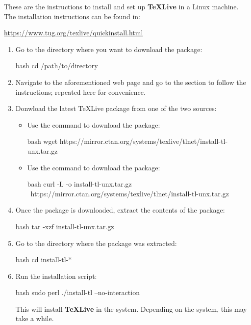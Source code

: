 These are the instructions to install and set up \textbf{TeXLive} in a Linux machine. The
installation instructions can be found in:
\begin{center}
    \url{https://www.tug.org/texlive/quickinstall.html}
\end{center}
\begin{enumerate}
    \item Go to the directory where you want to download the package:
    \begin{mintedbox}{bash}
cd /path/to/directory
    \end{mintedbox}
    \item Navigate to the aforementioned web page and go to the 
    section to follow the instructions; repeated here for convenience.
    \item Donwload the latest TeXLive package from one of the two sources:
    \begin{itemize}
        \item Use the  command to download the package:
        \begin{mintedbox}{bash}
wget https://mirror.ctan.org/systems/texlive/tlnet/install-tl-unx.tar.gz
        \end{mintedbox}
        \item Use the  command to download the package:
        \begin{mintedbox}{bash}
curl -L -o install-tl-unx.tar.gz \
https://mirror.ctan.org/systems/texlive/tlnet/install-tl-unx.tar.gz
        \end{mintedbox}
    \end{itemize}
    \item Once the package is downloaded, extract the contents of the package:
    \begin{mintedbox}{bash}
tar -xzf install-tl-unx.tar.gz
    \end{mintedbox}
    \item Go to the directory where the package was extracted:
    \begin{mintedbox}{bash}
cd install-tl-*
    \end{mintedbox}
    \item Run the installation script:
    \begin{mintedbox}{bash}
sudo perl ./install-tl --no-interaction
    \end{mintedbox}
    This will install \textbf{TeXLive} in the system. Depending on the system, this may take a
    while.
\end{enumerate}


